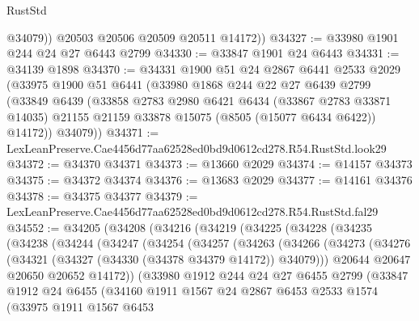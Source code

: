 \begin{lexlean}{RustStd}
\begin{coremodule}
            @34079))
        @20503
        @20506
        @20509
        @20511
        @14172))
@34327 := @33980 @1901 @244 @24 @27 @6443 @2799
@34330 := @33847 @1901 @24 @6443
@34331 := @34139 @1898
@34370 := @34331
    @1900
    @51
    @24
    @2867
    @6441
    @2533
    @2029
    (@33975
      @1900
      @51
      @6441
      (@33980
        @1868
        @244
        @22
        @27
        @6439
        @2799
        (@33849
          @6439
          (@33858
            @2783
            @2980
            @6421
            @6434
            (@33867 @2783 @33871 @14035)
            @21155
            @21159
            @33878
            @15075
            (@8505 (@15077 @6434 @6422))
            @14172))
        @34079))
@34371 := LexLeanPreserve.Cae4456d77aa62528ed0bd9d0612cd278.R54.RustStd.look29
@34372 := @34370 @34371
@34373 := @13660 @2029
@34374 := @14157 @34373
@34375 := @34372 @34374
@34376 := @13683 @2029
@34377 := @14161 @34376
@34378 := @34375 @34377
@34379 := LexLeanPreserve.Cae4456d77aa62528ed0bd9d0612cd278.R54.RustStd.fal29
@34552 := @34205
    (@34208
      (@34216
        (@34219
          (@34225
            (@34228
              (@34235
                (@34238
                  (@34244
                    (@34247
                      (@34254
                        (@34257
                          (@34263
                            (@34266
                              (@34273
                                (@34276 (@34321 (@34327 (@34330 (@34378 @34379 @14172)) @34079)))
                                @20644
                                @20647
                                @20650
                                @20652
                                @14172))
                            (@33980
                              @1912
                              @244
                              @24
                              @27
                              @6455
                              @2799
                              (@33847
                                @1912
                                @24
                                @6455
                                (@34160
                                  @1911
                                  @1567
                                  @24
                                  @2867
                                  @6453
                                  @2533
                                  @1574
                                  (@33975
                                    @1911
                                    @1567
                                    @6453

\end{coremodule}
\end{lexlean}
